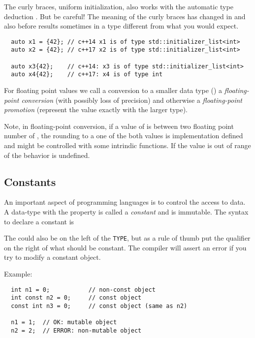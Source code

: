 \begin{rem}
  The\marginpar{[\cxx{17}]} curly braces, \ie uniform initialization, also works with the automatic type deduction . But be careful! The meaning
  of the curly braces has changed in  and also before results sometimes in a type different from what you would expect.
  \begin{verbatim}
  auto x1 = {42}; // c++14 x1 is of type std::initializer_list<int>
  auto x2 = {42}; // c++17 x2 is of type std::initializer_list<int>

  auto x3{42};    // c++14: x3 is of type std::initializer_list<int>
  auto x4{42};    // c++17: x4 is of type int
  \end{verbatim}
\end{rem}

\begin{defn}
  For floating point values we call a conversion to a smaller data type (\eg {}) a \emph{floating-point conversion} (with possibly loss of precision) and otherwise a \emph{floating-point promotion} (represent the value exactly with the larger type).
\end{defn}

\begin{rem}
  Note, in floating-point conversion, if a value of  is between two floating point number of , the rounding to a one of the both values is implementation defined and might be controlled with some intrindic functions. If the value is out of range of  the behavior is undefined.
\end{rem}

\subsection{Constants\label{sec:const}}
An important aspect of programming languages is to control the access to data. A data-type with the property 
is called a \emph{constant} and is immutable. The syntax to declare a constant is


The  could also be on the left of the \texttt{TYPE}, but as a rule of thumb put the qualifier  on the right of what
should be constant. The compiler will assert an error if you try to modify a constant object.

Example:
\begin{verbatim}
  int n1 = 0;           // non-const object
  int const n2 = 0;     // const object
  const int n3 = 0;     // const object (same as n2)

  n1 = 1;  // OK: mutable object
  n2 = 2;  // ERROR: non-mutable object
\end{verbatim}

